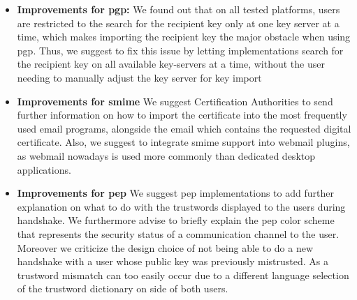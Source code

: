 \begin{itemize}
	\item \textbf{Improvements for \acrshort{pgp}:}\newline
	We found out that on all tested platforms, users are restricted to the search for the recipient key only at one key server at a time, which makes importing the recipient key the major obstacle when using \acrshort{pgp}. Thus, we suggest to fix this issue by letting implementations search for the recipient key on all available key-servers at a time, without the user needing to manually adjust the key server for key import
	\item \textbf{Improvements for \acrshort{smime}}\newline
	We suggest Certification Authorities to send further information on how to import the certificate into the most frequently used email programs, alongside the email which contains the requested digital certificate. Also, we suggest to integrate \acrshort{smime} support into webmail plugins, as webmail nowadays is used more commonly than dedicated desktop applications.
	\item \textbf{Improvements for \acrshort{pep}}\newline
	We suggest \acrshort{pep} implementations to add further explanation on what to do with the trustwords displayed to the users during handshake. We furthermore advise to briefly explain the \acrshort{pep} color scheme that represents the security status of a communication channel to the user.
	Moreover we criticize the design choice of not being able to do a new handshake with a user whose public key was previously mistrusted. As a trustword mismatch can too easily occur due to a different language selection of the trustword dictionary on side of both users.	
\end{itemize}
